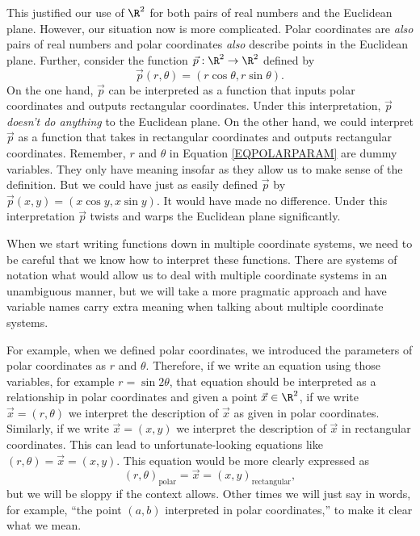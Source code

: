 This justified our use of $\R^2$ for both pairs of real numbers and the Euclidean plane.  However, our
situation now is more complicated.  Polar coordinates are \emph{also} pairs of real numbers
and polar coordinates \emph{also} describe points in the Euclidean plane.  Further, consider the function
$\vec p:\R^2\to\R^2$ defined by
\begin{equation}
	\label{EQPOLARPARAM}
	\vec p(r,\theta) = (r\cos\theta,r\sin\theta).
\end{equation}
On the one hand, $\vec p$ can be interpreted as a function that inputs polar coordinates and outputs
rectangular coordinates.  Under this interpretation, $\vec p$ \emph{doesn't do anything} to
the Euclidean plane.  On the other hand, we could interpret $\vec p$ as a function that takes in
rectangular coordinates and outputs rectangular coordinates.  Remember, $r$ and $\theta$ in Equation
\eqref{EQPOLARPARAM} are dummy variables.  They only have meaning insofar as they allow us to make
sense of the definition.  But we could have just as easily defined $\vec p$ by $\vec p(x,y) = (x\cos y,x\sin y)$.
It would have made no difference.  Under this interpretation $\vec p$ twists and warps the Euclidean
plane significantly.

When we start writing functions down in multiple coordinate systems, we need to be careful
that we know how to interpret these functions.  There are systems of notation what would allow
us to deal with multiple coordinate systems in an unambiguous manner, but we will take a more
pragmatic approach and have variable names carry extra meaning when talking about multiple coordinate systems.

For example, when we defined polar coordinates, we introduced the parameters of polar coordinates
as $r$ and $\theta$.  Therefore, if we write an equation using those variables,
for example $r=\sin2\theta$, that equation should be interpreted as a relationship in polar coordinates
and given a point $\vec x\in\R^2$, if we write $\vec x=(r,\theta)$ we interpret the description of $\vec x$
as given in polar coordinates.  Similarly, if we write $\vec x=(x,y)$ we interpret the description of $\vec x$
in rectangular coordinates.  This can lead to unfortunate-looking equations like $(r,\theta)=\vec x=(x,y)$.
This equation would be more clearly expressed as
\[
	(r,\theta)_{\text{polar}} = \vec x=(x,y)_{\text{rectangular}},
\]
but we will be sloppy if the context allows.  Other times we will just say in words, for example, ``the
point $(a,b)$ interpreted in polar coordinates,'' to make it clear what we mean.

